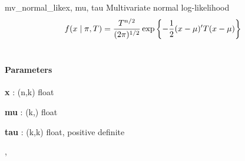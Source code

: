 \hypertarget{pymc.distributions.mv_normal_like}{}
\begin{funcdesc}{mv\_normal\_like}{x, mu, tau}
Multivariate normal log-likelihood
\begin{gather}
\begin{split}f(x \mid \pi, T) = \frac{T^{n/2}}{(2\pi)^{1/2}} \exp\left\{ -\frac{1}{2} (x-\mu)^{\prime}T(x-\mu) \right\}\end{split}\notag\\\begin{split}\end{split}\notag
\end{gather}\paragraph{Parameters}\begin{paramlist}

\item[] \textbf{x} : (n,k) float

\item[] \textbf{mu} : (k,) float

\item[] \textbf{tau} : (k,k) float, positive definite
\end{paramlist}



\hyperlink{pymc.distributions.mv_normal_chol_like}{}, \hyperlink{pymc.distributions.mv_normal_cov_like}{}


\end{funcdesc}


